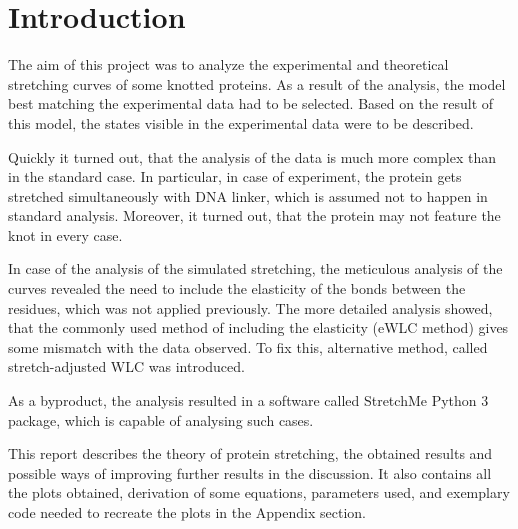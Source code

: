 \chapter{Introduction}
\label{chap:intro}

The aim of this project was to analyze the experimental and theoretical stretching curves of some knotted proteins.
As a result of the analysis, the model best matching the experimental data had to be selected.
Based on the result of this model, the states visible in the experimental data were to be described.

Quickly it turned out, that the analysis of the data is much more complex than in the standard case.
In particular, in case of experiment, the protein gets stretched simultaneously with DNA linker, which is assumed not to happen in standard analysis.
Moreover, it turned out, that the protein may not feature the knot in every case.

In case of the analysis of the simulated stretching, the meticulous analysis of the curves revealed the need to include the elasticity of the bonds between the residues, which was not applied previously.
The more detailed analysis showed, that the commonly used method of including the elasticity (eWLC method) gives some mismatch with the data observed.
To fix this, alternative method, called stretch-adjusted WLC was introduced.

As a byproduct, the analysis resulted in a software called StretchMe Python 3 package, which is capable of analysing such cases.

This report describes the theory of protein stretching, the obtained results and possible ways of improving further results in the discussion.
It also contains all the plots obtained, derivation of some equations, parameters used, and exemplary code needed to recreate the plots in the Appendix section.